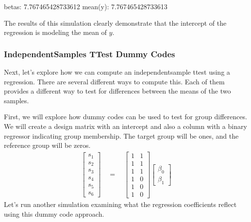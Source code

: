 \documentclass[letterpaper,10pt,english]{sphinxmanual}
\begin{document}
\begin{sphinxVerbatim}[commandchars=\\\{\}]
betas: 7.767465428733612
mean(y): 7.767465428733613
\end{sphinxVerbatim}

\noindent{}

The results of this simulation clearly demonstrate that the intercept of the regression is modeling the mean of \(y\).


\subsubsection{Independent\sphinxhyphen{}Samples T\sphinxhyphen{}Test \sphinxhyphen{} Dummy Codes}
\label{\detokenize{content/Group_Analysis:independent-samples-t-test-dummy-codes}}
Next, let’s explore how we can compute an independent\sphinxhyphen{}sample t\sphinxhyphen{}test using a regression. There are several different ways to compute this. Each of them provides a different way to test for differences between the means of the two samples.

First, we will explore how dummy codes can be used to test for group differences. We will create a design matrix with an intercept and also a column with a binary regressor indicating group membership. The target group will be ones, and the reference group will be zeros.
\begin{equation*}
\begin{split}
\begin{bmatrix}
s_1 \\
s_2 \\
s_3 \\
s_4 \\
s_5 \\
s_6
\end{bmatrix}
\quad
=
\quad
\begin{bmatrix}
1 & 1\\
1 & 1\\
1 & 1\\
1 & 0\\
1 & 0\\
1 & 0
\end{bmatrix}
\begin{bmatrix}
\beta_0 \\
\beta_1
\end{bmatrix}
\end{split}
\end{equation*}
Let’s run another simulation examining what the regression coefficients reflect using this dummy code approach.
\end{document}
